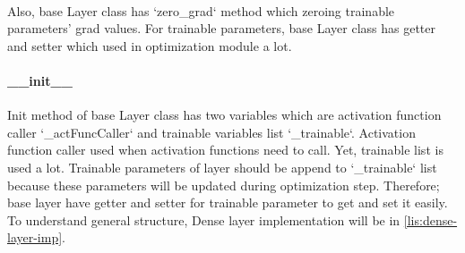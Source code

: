 \documentclass[12pt]{report}
\begin{document}
\paragraph{}
Also, base Layer class has `zero\_grad` method which zeroing trainable parameters' grad values. For trainable parameters, base Layer class has getter and setter which used in optimization module a lot.

\paragraph{\_\_init\_\_}
Init method of base Layer class has two variables which are activation function caller `\_actFuncCaller` and trainable variables list `\_trainable`. Activation function caller used when activation functions need to call. Yet, trainable list is used a lot. Trainable parameters of layer should be append to `\_trainable` list because these parameters will be updated during optimization step. Therefore; base layer have getter and setter for trainable parameter to get and set it easily. To understand general structure, Dense layer implementation will be in \ref{lis:dense-layer-imp}.
\end{document}
